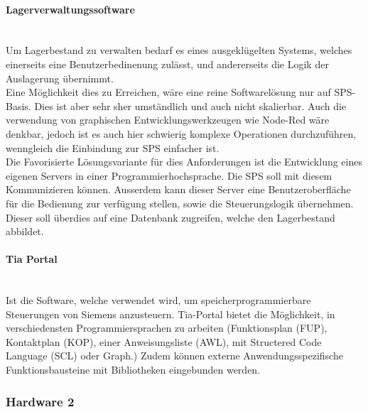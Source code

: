 \paragraph{Lagerverwaltungssoftware}\mbox{}\\
Um Lagerbestand zu verwalten bedarf es eines ausgeklügelten Systems, welches einerseits eine Benutzerbedinenung zulässt, und andererseits die Logik der Auslagerung übernimmt. \\
Eine Möglichkeit dies zu Erreichen, wäre eine reine Softwarelösung nur auf SPS-Basis. Dies ist aber sehr sher umständlich und auch nicht skalierbar. Auch die verwendung von graphischen Entwicklungswerkzeugen wie Node-Red wäre denkbar, jedoch ist es auch hier schwierig komplexe Operationen durchzuführen, wenngleich die Einbindung zur SPS einfacher ist.\\
Die Favorisierte Lösungsvariante für dies Anforderungen ist die Entwicklung eines eigenen Servers in einer Programmierhochsprache. Die SPS soll mit diesem Kommunizieren können. Ausserdem kann dieser Server eine Benutzeroberfläche für die Bedienung zur verfügung stellen, sowie die Steuerungslogik übernehmen. Dieser soll überdies auf eine Datenbank zugreifen, welche den Lagerbestand abbildet.


\paragraph{Tia Portal}\mbox{}\\
Ist die Software, welche verwendet wird, um speicherprogrammierbare Steuerungen von Siemens anzusteuern. Tia-Portal bietet die Möglichkeit, in verschiedensten Programmiersprachen zu arbeiten (Funktionsplan (FUP), Kontaktplan (KOP), einer Anweisungsliste (AWL), mit Structered Code Language (SCL) oder Graph.) Zudem können externe Anwendungsspezifische Funktionsbausteine mit Bibliotheken eingebunden werden.
\cite{TIA_Portal_Programmiersprachen}

\subsubsection{Hardware 2}

